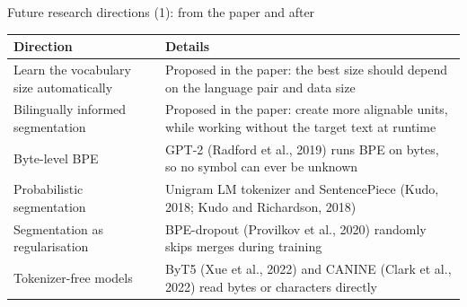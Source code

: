 \documentclass[aspectratio=169,11pt]{beamer}
\begin{document}
\begin{frame}{Future research directions (1): from the paper and after}
  \small
  \begin{tabularx}{\textwidth}{@{}lX@{}}
    \toprule
    Direction & Details\\
    \midrule
    Learn the vocabulary size automatically & Proposed in the paper: the best size should depend on the language pair and data size\\
    Bilingually informed segmentation & Proposed in the paper: create more alignable units, while working without the target text at runtime\\
    Byte-level BPE & GPT-2 (Radford et al., 2019) runs BPE on bytes, so no symbol can ever be unknown\\
    Probabilistic segmentation & Unigram LM tokenizer and SentencePiece (Kudo, 2018; Kudo and Richardson, 2018)\\
    Segmentation as regularisation & BPE-dropout (Provilkov et al., 2020) randomly skips merges during training\\
    Tokenizer-free models & ByT5 (Xue et al., 2022) and CANINE (Clark et al., 2022) read bytes or characters directly\\
    \bottomrule
  \end{tabularx}
\end{frame}
\end{document}

